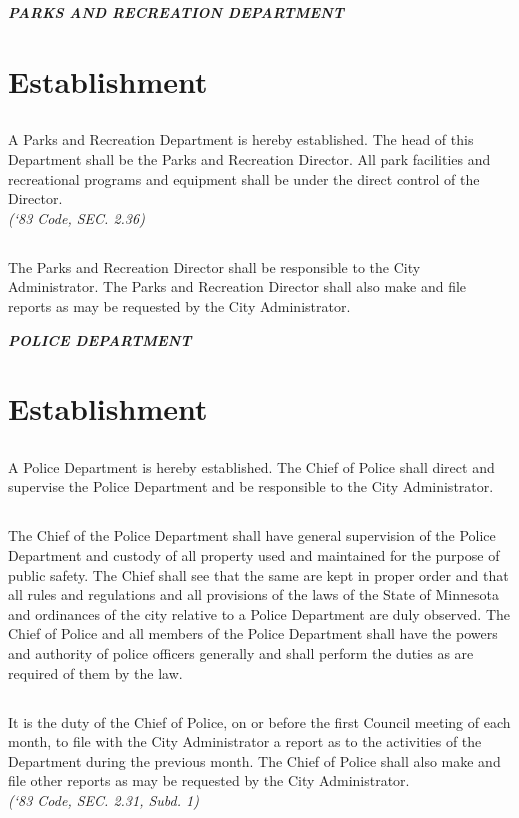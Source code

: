 \centerline{\textbf{\emph{\LARGE{PARKS AND RECREATION DEPARTMENT}}}}
\setcounter{section}{59}
\section{Establishment}
\subsection{}
A Parks and Recreation Department is hereby established. The head of this Department shall be the Parks and Recreation Director. All park facilities and recreational programs and equipment shall be under the direct control of the Director.\\
\emph{(‘83 Code, SEC. 2.36)}
\subsection{}
The Parks and Recreation Director shall be responsible to the City Administrator. The Parks and Recreation Director shall also make and file reports as may be requested by the City Administrator.\\

\centerline{\textbf{\emph{\LARGE{POLICE DEPARTMENT}}}}
\setcounter{section}{69}
\section{Establishment}
\subsection{}
A Police Department is hereby established. The Chief of Police shall direct and supervise the Police Department and be responsible to the City Administrator.
\subsection{}
The Chief of the Police Department shall have general supervision of the Police Department and custody of all property used and maintained for the purpose of public safety.  The Chief shall see that the same are kept in proper order and that all rules and regulations and all provisions of the laws of the State of Minnesota and ordinances of the city relative to a Police Department are duly observed. The Chief of Police and all members of the Police Department shall have the powers and authority of police officers generally and shall perform the duties as are required of them by the law.
\subsection{}
It is the duty of the Chief of Police, on or before the first Council meeting of each month, to file with the City Administrator a report as to the activities of the Department during the previous month. The Chief of Police shall also make and file other reports as may be requested by the City Administrator.\\
\emph{(‘83 Code, SEC. 2.31, Subd. 1)}
